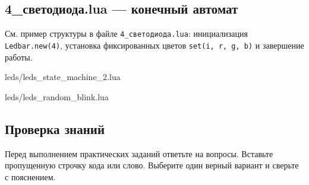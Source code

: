 \subsection{4\_светодиода.lua — конечный автомат}
См. пример структуры в файле \verb|4_светодиода.lua|: инициализация \verb|Ledbar.new(4)|, установка фиксированных цветов \verb|set(i, r, g, b)| и завершение работы.

\begin{codefile}{leds/leds_state_machine_2.lua}
\end{codefile}

\begin{codefile}{leds/leds_random_blink.lua}
\end{codefile}
\subsection{Проверка знаний}
Перед выполнением практических заданий ответьте на вопросы. Вставьте пропущенную строчку кода или слово. Выберите один верный вариант и сверьте с пояснением.
